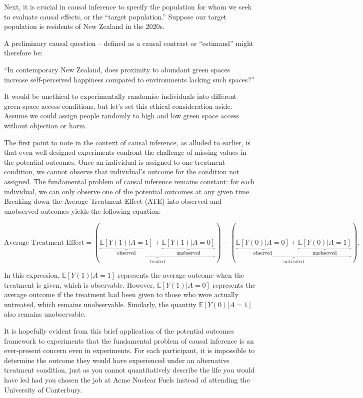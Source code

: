 \documentclass[
  singlecolumn]{article}
\begin{document}
Next, it is crucial in causal inference to specify the population for
whom we seek to evaluate causal effects, or the ``target population.''
Suppose our target population is residents of New Zealand in the 2020s.

A preliminary causal question -- defined as a causal contrast or
``estimand'' might therefore be:

``In contemporary New Zealand, does proximity to abundant green spaces
increase self-perceived happiness compared to environments lacking such
spaces?''

It would be unethical to experimentally randomise individuals into
different green-space access conditions, but let's set this ethical
consideration aside. Assume we could assign people randomly to high and
low green space access without objection or harm.

The first point to note in the context of causal inference, as alluded
to earlier, is that even well-designed experiments confront the
challenge of missing values in the potential outcomes. Once an
individual is assigned to one treatment condition, we cannot observe
that individual's outcome for the condition not assigned. The
fundamental problem of causal inference remains constant: for each
individual, we can only observe one of the potential outcomes at any
given time. Breaking down the Average Treatment Effect (ATE) into
observed and unobserved outcomes yields the following equation:

\[
\text{Average Treatment Effect} = \left(\underbrace{\underbrace{\mathbb{E}[Y(1)|A = 1]}_{\text{observed}} + \underbrace{\mathbb{E}[Y(1)|A = 0]}_{\text{unobserved}}}_{\text{treated}}\right) - \left(\underbrace{\underbrace{\mathbb{E}[Y(0)|A = 0]}_{\text{observed}} + \underbrace{\mathbb{E}[Y(0)|A = 1]}_{\text{unobserved}}}_{\text{untreated}}\right).
\]

In this expression, \(\mathbb{E}[Y(1)|A = 1]\) represents the average
outcome when the treatment is given, which is observable. However,
\(\mathbb{E}[Y(1)|A = 0]\) represents the average outcome if the
treatment had been given to those who were actually untreated, which
remains unobservable. Similarly, the quantity \(\mathbb{E}[Y(0)|A = 1]\)
also remains unobservable.

It is hopefully evident from this brief application of the potential
outcomes framework to experiments that the fundamental problem of causal
inference is an ever-present concern even in experiments. For each
participant, it is impossible to determine the outcome they would have
experienced under an alternative treatment condition, just as you cannot
quantitatively describe the life you would have led had you chosen the
job at Acme Nuclear Fuels instead of attending the University of
Canterbury.
\end{document}
